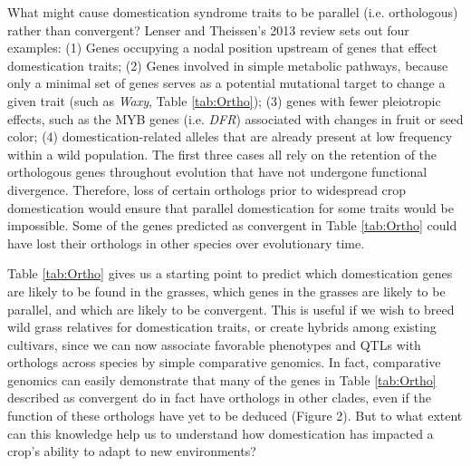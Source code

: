\documentclass[12pt]{article}
\begin{document}
What might cause domestication syndrome traits to be parallel (i.e. orthologous) rather than convergent?
Lenser and Theissen's 2013 review \citep{Lenser2013} sets out four examples: (1) Genes occupying a nodal position upstream of genes that effect domestication traits; (2) Genes involved in simple metabolic pathways, because only a minimal set of genes serves as a potential mutational target to change a given trait (such as \textit{Waxy}, Table \ref{tab:Ortho}); (3) genes with fewer pleiotropic effects, such as the MYB genes (i.e. \textit{DFR}) associated with changes in fruit or seed color; (4) domestication-related alleles that are already present at low frequency within a wild population. 
The first three cases all rely on the retention of the orthologous genes throughout evolution that have not undergone functional divergence.
Therefore, loss of certain orthologs prior to widespread crop domestication would ensure that parallel domestication for some traits would be impossible.
Some of the genes predicted as convergent in Table \ref{tab:Ortho} could have lost their orthologs in other species over evolutionary time.

Table \ref{tab:Ortho} gives us a starting point to predict which domestication genes are likely to be found in the grasses, which genes in the grasses are likely to be parallel, and which are likely to be convergent. This is useful if we wish to breed wild grass relatives for domestication traits, or create hybrids among existing cultivars, since we can now associate favorable phenotypes and QTLs with orthologs across species by simple comparative genomics. In fact, comparative genomics can easily demonstrate that many of the genes in Table \ref{tab:Ortho} described as convergent do in fact have orthologs in other clades, even if the function of these orthologs have yet to be deduced (Figure 2).  But to what extent can this knowledge help us to understand how domestication has impacted a crop's ability to adapt to new environments?
\paragraph{}
\end{document}
